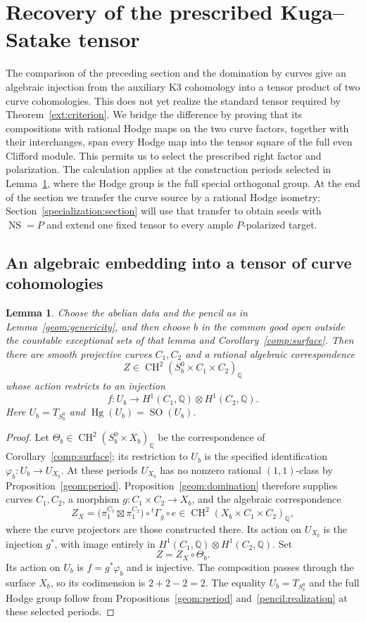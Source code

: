 \documentclass[11pt]{amsart}
\newcommand{\Q}{\mathbb Q}
\DeclareMathOperator{\NS}{NS}
\DeclareMathOperator{\CH}{CH}
\DeclareMathOperator{\Hg}{Hg}
\DeclareMathOperator{\SO}{SO}
\newtheorem{lemma}[theorem]{Lemma}
\theoremstyle{definition}
\theoremstyle{remark}
\numberwithin{equation}{section}
\begin{document}
\section{Recovery of the prescribed Kuga--Satake tensor}
\label{final:section}

The comparison of the preceding section and the domination by curves
give an algebraic injection from the auxiliary K3 cohomology into a
tensor product of two curve cohomologies.  This does not yet realize
the standard tensor required by Theorem~\ref{ext:criterion}.  We bridge
the difference by proving that its compositions with rational Hodge maps
on the two curve factors, together with their interchanges, span every
Hodge map into the tensor square of the full even Clifford module.
This permits us to select the prescribed right factor and polarization.
The calculation applies at the construction periods selected in
Lemma~\ref{final:curves}, where the Hodge group is the full special
orthogonal group.
At the end of the section we transfer the curve source by a rational
Hodge isometry; Section~\ref{specialization:section} will use that transfer
to obtain seeds with $\NS=P$ and extend one fixed tensor to every ample
$P$-polarized target.

\subsection{An algebraic embedding into a tensor of curve cohomologies}

\begin{lemma}\label{final:curves}
Choose the abelian data and the pencil as in
Lemma~\ref{geom:genericity}, and then choose $b$ in the common good open
outside the countable exceptional sets of that lemma and
Corollary~\ref{comp:surface}.  Then there are smooth projective curves
$C_1,C_2$ and a rational algebraic correspondence
\[
 Z\in\CH^2(S_b^0\times C_1\times C_2)_{\Q}
\]
whose action restricts to an injection
\[
 f:U_b\longrightarrow H^1(C_1,\Q)\otimes H^1(C_2,\Q).
\]
Here $U_b=T_{S_b^0}$ and $\Hg(U_b)=\SO(U_b)$.
\end{lemma}

\begin{proof}
Let $\Theta_b\in\CH^2(S_b^0\times X_b)_\Q$ be the correspondence
of Corollary~\ref{comp:surface}; its restriction to $U_b$ is the
specified identification $\varphi_b:U_b\to U_{X_b}$.
At these periods $U_{X_b}$ has no nonzero rational $(1,1)$-class
by Proposition~\ref{geom:period}. Proposition~\ref{geom:domination}
therefore supplies curves $C_1,C_2$, a morphism
$g:C_1\times C_2\to X_b$, and the algebraic correspondence
\[
 Z_X=\bigl(\pi_1^{C_1}\boxtimes\pi_1^{C_2}\bigr)
       \circ{}^t\Gamma_g\circ e
 \in\CH^2(X_b\times C_1\times C_2)_\Q,
\]
where the curve projectors are those constructed there. Its action on
$U_{X_b}$ is the injection $g^*$, with image entirely in
$H^1(C_1,\Q)\otimes H^1(C_2,\Q)$. Set
\[
 Z=Z_X\circ\Theta_b.
\]
Its action on $U_b$ is $f=g^*\varphi_b$ and is injective. The
composition passes through the surface $X_b$, so its codimension is
$2+2-2=2$. The equality $U_b=T_{S_b^0}$ and the full Hodge group
follow from Propositions~\ref{geom:period} and~\ref{pencil:realization}
at these selected periods.
\end{proof}
\end{document}
